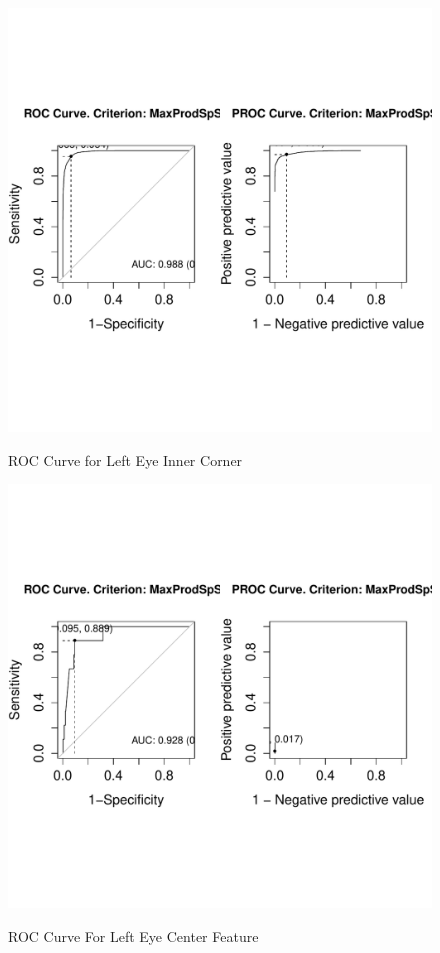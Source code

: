 \documentclass[journal]{IEEEtran}
\begin{document}
\begin{figure}[!htb]
  \centering
  \caption{ROC Curve for Left Eye Inner Corner}
  \includegraphics[scale=.5]{roc_left_eye_inner_corner.pdf}
  \label{fig:roc_left_eye_inner_corner}
\end{figure}

\begin{figure}[!htb]
  \centering
  \caption{ROC Curve For Left Eye Center Feature}
  \includegraphics[scale=.5]{roc_left_eye_center.pdf}
  \label{fig:roc_left_eye_center}
\end{figure}
\end{document}
